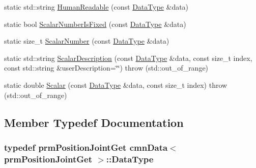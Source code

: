 \begin{DoxyCompactItemize}
\item 
static std\-::string \hyperlink{classcmn_data_3_01prm_position_joint_get_01_4_af10a289e8be91d1b609c9a3a7a4bfe3d}{Human\-Readable} (const \hyperlink{classcmn_data_3_01prm_position_joint_get_01_4_ade75e8432e51840dc4c2aa616544c2b6}{Data\-Type} \&data)
\item 
static bool \hyperlink{classcmn_data_3_01prm_position_joint_get_01_4_a377ec2239a574c2cd22b45c47cdcf8d0}{Scalar\-Number\-Is\-Fixed} (const \hyperlink{classcmn_data_3_01prm_position_joint_get_01_4_ade75e8432e51840dc4c2aa616544c2b6}{Data\-Type} \&data)
\item 
static size\-\_\-t \hyperlink{classcmn_data_3_01prm_position_joint_get_01_4_a1e0fcb63cd84dc91c8e5f75ef908c33b}{Scalar\-Number} (const \hyperlink{classcmn_data_3_01prm_position_joint_get_01_4_ade75e8432e51840dc4c2aa616544c2b6}{Data\-Type} \&data)
\item 
static std\-::string \hyperlink{classcmn_data_3_01prm_position_joint_get_01_4_a9a913cde2bce0c929999ecc4e1a83883}{Scalar\-Description} (const \hyperlink{classcmn_data_3_01prm_position_joint_get_01_4_ade75e8432e51840dc4c2aa616544c2b6}{Data\-Type} \&data, const size\-\_\-t index, const std\-::string \&user\-Description=\char`\"{}\char`\"{})  throw (std\-::out\-\_\-of\-\_\-range)
\item 
static double \hyperlink{classcmn_data_3_01prm_position_joint_get_01_4_a565b4a5d6db81e9042aa6db4cb534f6f}{Scalar} (const \hyperlink{classcmn_data_3_01prm_position_joint_get_01_4_ade75e8432e51840dc4c2aa616544c2b6}{Data\-Type} \&data, const size\-\_\-t index)  throw (std\-::out\-\_\-of\-\_\-range)
\end{DoxyCompactItemize}


\subsection{Member Typedef Documentation}
\hypertarget{classcmn_data_3_01prm_position_joint_get_01_4_ade75e8432e51840dc4c2aa616544c2b6}{
\subsubsection[{Data\-Type}]{\setlength{\rightskip}{0pt plus 5cm}typedef {\bf prm\-Position\-Joint\-Get} {\bf cmn\-Data}$<$ {\bf prm\-Position\-Joint\-Get} $>$\-::{\bf Data\-Type}}}\label{classcmn_data_3_01prm_position_joint_get_01_4_ade75e8432e51840dc4c2aa616544c2b6}


